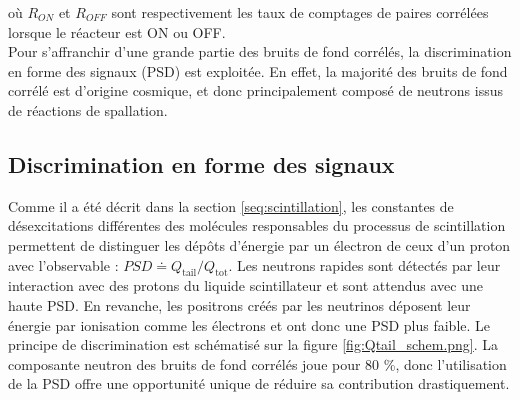 \bigbreak

où $R_{ON}$ et $R_{OFF}$ sont respectivement les taux de comptages de paires corrélées lorsque le réacteur est ON ou OFF.\\

Pour s'affranchir d'une grande partie des bruits de fond corrélés, la discrimination en forme des signaux (PSD) est exploitée. En effet, la majorité des bruits de fond corrélé est d'origine cosmique, et donc principalement composé de neutrons issus de réactions de spallation.

\bigbreak

\subsection{Discrimination en forme des signaux}
\label{sec:PSD_principe}


Comme il a été décrit dans la section \ref{seq:scintillation}, les constantes de désexcitations différentes des molécules responsables du processus de scintillation permettent de distinguer les dépôts d'énergie par un électron de ceux d'un proton avec l'observable : $PSD \doteq Q_\textrm{tail}/Q_\textrm{tot}$. Les neutrons rapides sont détectés par leur interaction avec des protons du liquide scintillateur et sont attendus avec une haute PSD. En revanche, les positrons créés par les neutrinos déposent leur énergie par ionisation comme les électrons et ont donc une PSD plus faible. Le principe de discrimination est schématisé sur la figure \ref{fig:Qtail_schem.png}. La composante neutron des bruits de fond corrélés joue pour 80 \%, donc l'utilisation de la PSD offre une opportunité unique de réduire sa contribution drastiquement.\\

